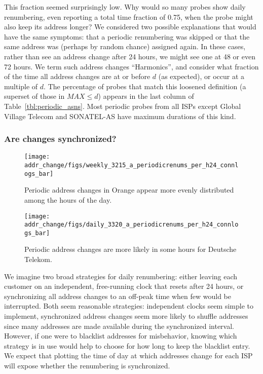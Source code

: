 This fraction seemed surprisingly low.  Why would so many
probes show daily renumbering, even reporting a total time
fraction of 0.75, when the probe might also keep its address longer?  We considered two possible explanations that
would have the same symptoms: that a periodic renumbering
was skipped or that the same address was (perhaps by random
chance) assigned again.  In these cases, rather than see an
address change after 24 hours, we might see one at 48 or
even 72 hours.  We term such address changes
``Harmonics'', and consider what fraction
of the time all address changes are at or before $d$ (as
expected), or occur at a multiple of $d$.  The percentage of
probes that match this loosened definition (a superset of those in
$MAX \leq d$) appears in the last column of Table~\ref{tbl:periodic_asns}.
Most periodic probes from all ISPs
except Global Village Telecom and SONATEL-AS have maximum durations of this kind.  

\clearpage

\subsubsection{Are changes synchronized?}

\begin{figure}[th]
 \centering
    \texttt{[image: addr\_change/figs/weekly\_3215\_a\_periodicrenums\_per\_h24\_connlogs\_bar]}
  \caption[Periodic address changes in Orange]{\label{fig:3215_renums_per_h24}Periodic address changes
    in Orange appear more evenly distributed among the hours of the
    day.}
\end{figure}

\begin{figure}[th]
  \centering
    \texttt{[image: addr\_change/figs/daily\_3320\_a\_periodicrenums\_per\_h24\_connlogs\_bar]}
  \caption[Periodic address changes in Deutsche Telekom]{\label{fig:3320_renums_per_h24}Periodic address changes
    are more likely in some hours for Deutsche Telekom.}
\end{figure}

We imagine two broad strategies for daily renumbering:
either leaving each customer on an independent, free-running
clock that resets after 24 hours, or synchronizing all
address changes to an off-peak time when few would be
interrupted.  Both seem reasonable strategies: independent
clocks seem simple to implement, synchronized address
changes seem more likely to shuffle addresses since many
addresses are made available during the synchronized
interval.  However, if one were to blacklist addresses for
misbehavior, knowing which strategy is in use would help to
choose for how long to keep the blacklist entry.  We expect
that plotting the time of day at which addresses change for
each ISP will expose whether the renumbering is synchronized.

